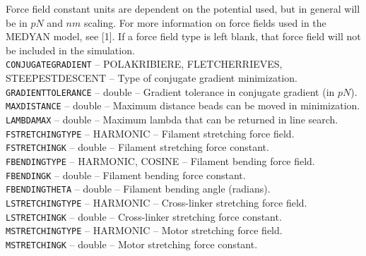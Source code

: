 \documentclass[11pt, oneside]{article}   	%
\begin{document}
\noindent Force field constant units are dependent on the potential used, but in general will be in $pN$ and $nm$ scaling. For more information on force fields used in the MEDYAN model, see [1]. If a force field type is left blank, that force field will not be included in the simulation.\\

\small 
   \noindent \texttt{CONJUGATEGRADIENT} -- POLAKRIBIERE, FLETCHERRIEVES, STEEPESTDESCENT -- Type of conjugate gradient minimization. \\
   
    \noindent \texttt{GRADIENTTOLERANCE} -- double -- Gradient tolerance in conjugate gradient (in $pN$). \\
     
    \noindent  \texttt{MAXDISTANCE} -- double -- Maximum distance beads can be moved in minimization. \\
   
    \noindent  \texttt{LAMBDAMAX} -- double -- Maximum lambda that can be returned in line search. \\
   
    \noindent \texttt{FSTRETCHINGTYPE} -- HARMONIC -- Filament stretching force field. \\
  
    \noindent \texttt{FSTRETCHINGK} -- double -- Filament stretching force constant. \\
   
     \noindent \texttt{FBENDINGTYPE} -- HARMONIC, COSINE -- Filament bending force field. \\
   
     \noindent \texttt{FBENDINGK} -- double -- Filament bending force constant. \\
   
     \noindent \texttt{FBENDINGTHETA} -- double -- Filament bending angle (radians). \\
   
     \noindent \texttt{LSTRETCHINGTYPE} -- HARMONIC -- Cross-linker stretching force field.\\
   
     \noindent  \texttt{LSTRETCHINGK} -- double -- Cross-linker stretching force constant. \\
   
     \noindent \texttt{MSTRETCHINGTYPE} -- HARMONIC -- Motor stretching force field. \\
   
     \noindent \texttt{MSTRETCHINGK} -- double -- Motor stretching force constant. \\
   
\end{document}
